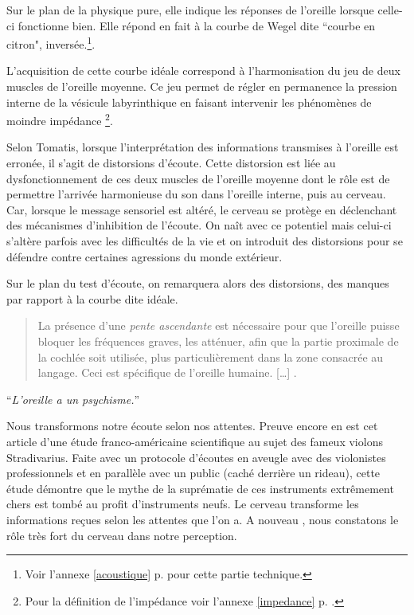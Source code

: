 Sur le plan de la physique pure, elle indique les réponses de l'oreille
lorsque celle-ci fonctionne bien. Elle répond en fait à la courbe
de Wegel dite ``courbe en citron", inversée.\footnote{%
		Voir l'annexe \ref{acoustique} p. \pageref{acoustique}
		 pour cette partie technique.}.

L'acquisition de cette courbe idéale correspond à l'harmonisation
du jeu de deux muscles de l'oreille moyenne. Ce jeu
permet de régler en permanence la pression interne de la vésicule
labyrinthique en faisant intervenir les phénomènes de moindre impédance%
\footnote{Pour la définition de l'impédance voir l'annexe \ref{impedance} 
	p. \pageref{impedance}.}.
 



Selon Tomatis, lorsque l'interprétation des informations transmises à l'oreille est erronée, il s'agit de
distorsions d'écoute. Cette distorsion est liée au dysfonctionnement
de ces deux muscles de l'oreille moyenne dont le rôle est de permettre l'arrivée
harmonieuse du son dans l'oreille interne, puis au cerveau. Car, lorsque
le message sensoriel est altéré, le cerveau se protège en déclenchant
des mécanismes d'inhibition de l'écoute. On naît
avec ce potentiel mais celui-ci s'altère parfois avec les difficultés
de la vie et on introduit des distorsions
pour se défendre contre certaines agressions du monde extérieur. 

Sur le plan du test d'écoute, on remarquera
alors des distorsions, des manques par rapport à la courbe dite 
idéale.

\blockquote{La présence d'une \emph{pente ascendante} est nécessaire pour que
l'oreille puisse bloquer les fréquences graves, les atténuer, afin
que la partie proximale de la cochlée soit utilisée, plus particulièrement
dans la zone consacrée au langage. Ceci est spécifique de l'oreille
humaine.  [\dots] \autocite{auriol_stress}. }

\enquote{\emph{L'oreille a un psychisme\autocite[correct? p.?]{tomatis:loreille}.}} 





Nous transformons notre écoute selon nos attentes. Preuve encore en est cet article d'une étude franco-américaine scientifique
\autocite{fritz_stradivarius} au sujet des fameux violons Stradivarius. Faite avec un protocole d'écoutes en aveugle avec
des violonistes professionnels et en parallèle avec un public (caché
derrière un rideau), cette étude démontre que le mythe de la suprématie
de ces instruments extrêmement chers est tombé au profit d'instruments
neufs. Le cerveau transforme les informations reçues
selon les attentes que l'on a. A nouveau , nous constatons le rôle très fort du cerveau dans notre perception.

